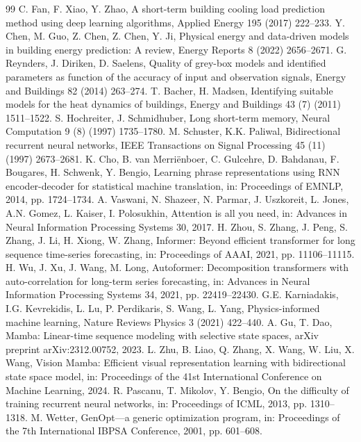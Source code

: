 \documentclass[11pt]{article}
\begin{document}
\begin{thebibliography}{99}
 C. Fan, F. Xiao, Y. Zhao, A short-term building cooling load prediction method using deep learning algorithms, Applied Energy 195 (2017) 222--233.
 Y. Chen, M. Guo, Z. Chen, Z. Chen, Y. Ji, Physical energy and data-driven models in building energy prediction: A review, Energy Reports 8 (2022) 2656--2671.
 G. Reynders, J. Diriken, D. Saelens, Quality of grey-box models and identified parameters as function of the accuracy of input and observation signals, Energy and Buildings 82 (2014) 263--274.
 T. Bacher, H. Madsen, Identifying suitable models for the heat dynamics of buildings, Energy and Buildings 43 (7) (2011) 1511--1522.
 S. Hochreiter, J. Schmidhuber, Long short-term memory, Neural Computation 9 (8) (1997) 1735--1780.
 M. Schuster, K.K. Paliwal, Bidirectional recurrent neural networks, IEEE Transactions on Signal Processing 45 (11) (1997) 2673--2681.
 K. Cho, B. van Merri\"enboer, C. Gulcehre, D. Bahdanau, F. Bougares, H. Schwenk, Y. Bengio, Learning phrase representations using RNN encoder-decoder for statistical machine translation, in: Proceedings of EMNLP, 2014, pp. 1724--1734.
 A. Vaswani, N. Shazeer, N. Parmar, J. Uszkoreit, L. Jones, A.N. Gomez, L. Kaiser, I. Polosukhin, Attention is all you need, in: Advances in Neural Information Processing Systems 30, 2017.
 H. Zhou, S. Zhang, J. Peng, S. Zhang, J. Li, H. Xiong, W. Zhang, Informer: Beyond efficient transformer for long sequence time-series forecasting, in: Proceedings of AAAI, 2021, pp. 11106--11115.
 H. Wu, J. Xu, J. Wang, M. Long, Autoformer: Decomposition transformers with auto-correlation for long-term series forecasting, in: Advances in Neural Information Processing Systems 34, 2021, pp. 22419--22430.
 G.E. Karniadakis, I.G. Kevrekidis, L. Lu, P. Perdikaris, S. Wang, L. Yang, Physics-informed machine learning, Nature Reviews Physics 3 (2021) 422--440.
 A. Gu, T. Dao, Mamba: Linear-time sequence modeling with selective state spaces, arXiv preprint arXiv:2312.00752, 2023.
 L. Zhu, B. Liao, Q. Zhang, X. Wang, W. Liu, X. Wang, Vision Mamba: Efficient visual representation learning with bidirectional state space model, in: Proceedings of the 41st International Conference on Machine Learning, 2024.
 R. Pascanu, T. Mikolov, Y. Bengio, On the difficulty of training recurrent neural networks, in: Proceedings of ICML, 2013, pp. 1310--1318.
 M. Wetter, GenOpt---a generic optimization program, in: Proceedings of the 7th International IBPSA Conference, 2001, pp. 601--608.

\end{thebibliography}
\end{document}

